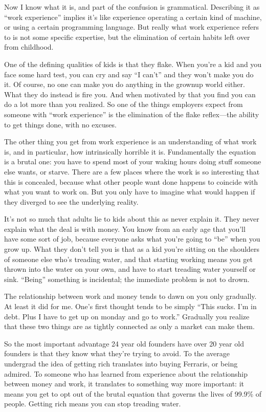 Now I know what it is, and part of the confusion is grammatical.
Describing it as ``work experience'' implies it's like experience
operating a certain kind of machine, or using a certain programming
language. But really what work experience refers to is not some specific
expertise, but the elimination of certain habits left over from
childhood.

One of the defining qualities of kids is that they flake. When you're a
kid and you face some hard test, you can cry and say ``I can't'' and
they won't make you do it. Of course, no one can make you do anything in
the grownup world either. What they do instead is fire you. And when
motivated by that you find you can do a lot more than you realized. So
one of the things employers expect from someone with ``work experience''
is the elimination of the flake reflex---the ability to get things done,
with no excuses.

The other thing you get from work experience is an understanding of what
work is, and in particular, how intrinsically horrible it is.
Fundamentally the equation is a brutal one: you have to spend most of
your waking hours doing stuff someone else wants, or starve. There are a
few places where the work is so interesting that this is concealed,
because what other people want done happens to coincide with what you
want to work on. But you only have to imagine what would happen if they
diverged to see the underlying reality.

It's not so much that adults lie to kids about this as never explain it.
They never explain what the deal is with money. You know from an early
age that you'll have some sort of job, because everyone asks what you're
going to ``be'' when you grow up. What they don't tell you is that as a
kid you're sitting on the shoulders of someone else who's treading
water, and that starting working means you get thrown into the water on
your own, and have to start treading water yourself or sink. ``Being''
something is incidental; the immediate problem is not to drown.

The relationship between work and money tends to dawn on you only
gradually. At least it did for me. One's first thought tends to be
simply ``This sucks. I'm in debt. Plus I have to get up on monday and go
to work.'' Gradually you realize that these two things are as tightly
connected as only a market can make them.

So the most important advantage 24 year old founders have over 20 year
old founders is that they know what they're trying to avoid. To the
average undergrad the idea of getting rich translates into buying
Ferraris, or being admired. To someone who has learned from experience
about the relationship between money and work, it translates to
something way more important: it means you get to opt out of the brutal
equation that governs the lives of 99.9\% of people. Getting rich means
you can stop treading water.

